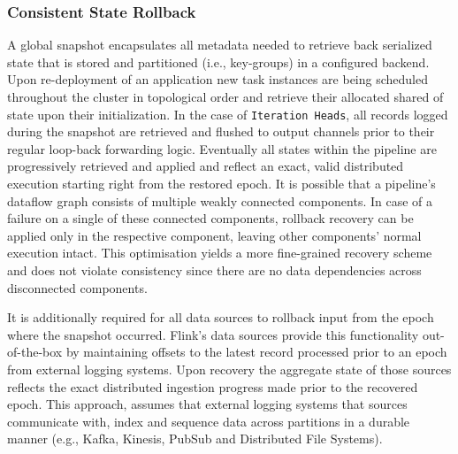 \subsubsection{Consistent State Rollback}
A global snapshot encapsulates all metadata needed to retrieve back serialized state that is stored and partitioned (i.e., key-groups) in a configured backend. Upon re-deployment of an application new task instances are being scheduled throughout the cluster in topological order and retrieve their allocated shared of state upon their initialization. In the case of  \texttt{Iteration Heads}, all records logged during the snapshot are retrieved and flushed to output channels prior to their regular loop-back forwarding logic. Eventually all states within the pipeline are progressively retrieved and applied and reflect an exact, valid distributed execution starting right from the restored epoch. It is possible that a pipeline's dataflow graph consists of multiple weakly connected components. In case of a failure on a single of these connected components, rollback recovery can be applied only in the respective component, leaving other components' normal execution intact. This optimisation yields a more fine-grained recovery scheme and does not violate consistency since there are no data dependencies across disconnected components. 

It is additionally required for all data sources to rollback input from the epoch where the snapshot occurred. Flink's data sources provide this functionality out-of-the-box by maintaining offsets to the latest record processed prior to an epoch from external logging systems. Upon recovery the aggregate state of those sources reflects the exact distributed ingestion progress made prior to the recovered epoch. This approach, assumes that external logging systems that sources communicate with, index and sequence data across partitions in a durable manner (e.g., Kafka, Kinesis, PubSub and Distributed File Systems). 



